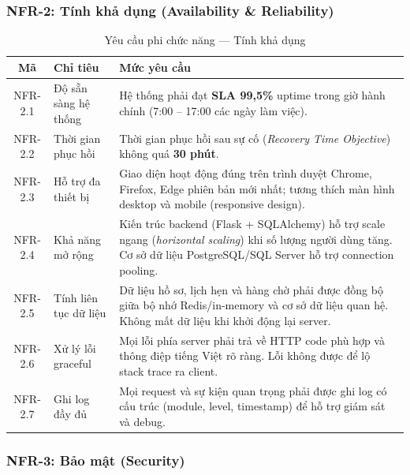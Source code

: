 \subsubsection{NFR-2: Tính khả dụng (Availability \& Reliability)}

\begin{table}[H]
\centering
\caption{Yêu cầu phi chức năng — Tính khả dụng}
\label{tab:nfr-avail}
\begin{tabularx}{\textwidth}{|c|l|X|}
\hline
\textbf{Mã} & \textbf{Chỉ tiêu} & \textbf{Mức yêu cầu} \\
\hline
NFR-2.1 & Độ sẵn sàng hệ thống &
  Hệ thống phải đạt \textbf{SLA 99,5\%} uptime trong giờ hành chính
  (7:00 – 17:00 các ngày làm việc). \\
\hline
NFR-2.2 & Thời gian phục hồi &
  Thời gian phục hồi sau sự cố (\textit{Recovery Time Objective})
  không quá \textbf{30 phút}. \\
\hline
NFR-2.3 & Hỗ trợ đa thiết bị &
  Giao diện hoạt động đúng trên trình duyệt Chrome, Firefox, Edge
  phiên bản mới nhất; tương thích màn hình desktop và mobile
  (responsive design). \\
\hline
NFR-2.4 & Khả năng mở rộng &
  Kiến trúc backend (Flask + SQLAlchemy) hỗ trợ scale ngang
  (\textit{horizontal scaling}) khi số lượng người dùng tăng.
  Cơ sở dữ liệu PostgreSQL/SQL Server hỗ trợ connection pooling. \\
\hline
NFR-2.5 & Tính liên tục dữ liệu &
  Dữ liệu hồ sơ, lịch hẹn và hàng chờ phải được đồng bộ giữa
  bộ nhớ Redis/in-memory và cơ sở dữ liệu quan hệ. Không mất dữ liệu
  khi khởi động lại server. \\
\hline
NFR-2.6 & Xử lý lỗi graceful &
  Mọi lỗi phía server phải trả về HTTP code phù hợp và thông điệp
  tiếng Việt rõ ràng. Lỗi không được để lộ stack trace ra client. \\
\hline
NFR-2.7 & Ghi log đầy đủ &
  Mọi request và sự kiện quan trọng phải được ghi log có cấu trúc
  (module, level, timestamp) để hỗ trợ giám sát và debug. \\
\hline
\end{tabularx}
\end{table}

\subsubsection{NFR-3: Bảo mật (Security)}

